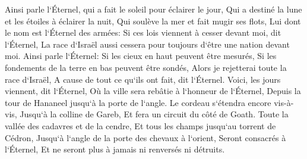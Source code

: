 \verse Ainsi parle l`Éternel, qui a fait le soleil pour éclairer le jour, Qui a destiné la lune et les étoiles à éclairer la nuit, Qui soulève la mer et fait mugir ses flots, Lui dont le nom est l`Éternel des armées: 
\verse Si ces lois viennent à cesser devant moi, dit l`Éternel, La race d`Israël aussi cessera pour toujours d`être une nation devant moi. 
\verse Ainsi parle l`Éternel: Si les cieux en haut peuvent être mesurés, Si les fondements de la terre en bas peuvent être sondés, Alors je rejetterai toute la race d`Israël, A cause de tout ce qu`ils ont fait, dit l`Éternel. 
\verse Voici, les jours viennent, dit l`Éternel, Où la ville sera rebâtie à l`honneur de l`Éternel, Depuis la tour de Hananeel jusqu`à la porte de l`angle. 
\verse Le cordeau s`étendra encore vis-à-vis, Jusqu`à la colline de Gareb, Et fera un circuit du côté de Goath. 
\verse Toute la vallée des cadavres et de la cendre, Et tous les champs jusqu`au torrent de Cédron, Jusqu`à l`angle de la porte des chevaux à l`orient, Seront consacrés à l`Éternel, Et ne seront plus à jamais ni renversés ni détruits. 

\chapter{}

